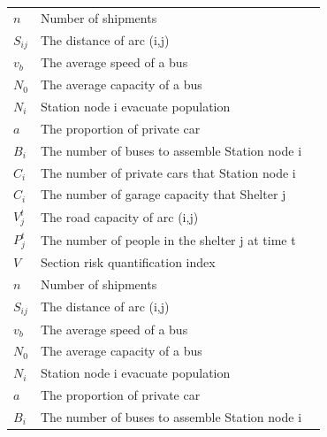 \documentclass{mcmthesis}
\begin{document}
\begin{center}
\begin{longtable}{p{}p{}m{}}
    $n$              & Number of shipments                                                       \\
    $S_{ij}$         & The distance of arc (i,j)                                                 \\
    $v_b$            & The average speed of a bus                                                \\
    $N_0$            & The average capacity of a bus                                             \\
    $N_i$            & Station node i evacuate population                                        \\
    $a$              & The proportion of private car                                             \\
    $B_i$            & The number of buses to assemble Station node i                            \\
    $C_i$            & The number of private cars that Station node i                            \\
    $C_i$            & The number of garage capacity that Shelter j                              \\
    $V_j^t$          & The road capacity of arc (i,j)                                            \\
    $P_j^t$          & The number of people in the shelter j at time t                           \\
    $V$              & Section risk quantification index                                         \\
    $n$              & Number of shipments                                                       \\
    $S_{ij}$         & The distance of arc (i,j)                                                 \\
    $v_b$            & The average speed of a bus                                                \\
    $N_0$            & The average capacity of a bus                                             \\
    $N_i$            & Station node i evacuate population                                        \\
    $a$              & The proportion of private car                                             \\
    $B_i$            & The number of buses to assemble Station node i                            \\

\end{longtable}
\end{center}
\end{document}
